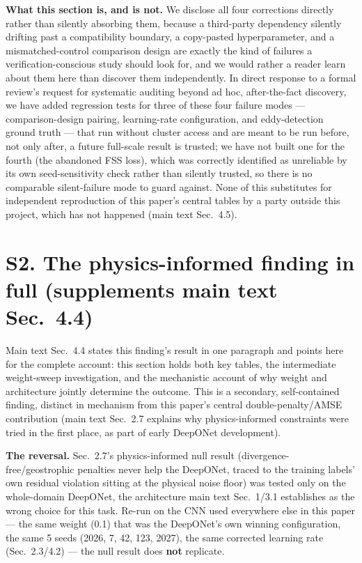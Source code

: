 \documentclass[11pt]{article}
\begin{document}
\textbf{What this section is, and is not.} We disclose all four corrections directly rather than silently absorbing them, because a third-party dependency silently drifting past a compatibility boundary, a copy-pasted hyperparameter, and a mismatched-control comparison design are exactly the kind of failures a verification-conscious study should look for, and we would rather a reader learn about them here than discover them independently. In direct response to a formal review's request for systematic auditing beyond ad hoc, after-the-fact discovery, we have added regression tests for three of these four failure modes --- comparison-design pairing, learning-rate configuration, and eddy-detection ground truth --- that run without cluster access and are meant to be run before, not only after, a future full-scale result is trusted; we have not built one for the fourth (the abandoned FSS loss), which was correctly identified as unreliable by its own seed-sensitivity check rather than silently trusted, so there is no comparable silent-failure mode to guard against. None of this substitutes for independent reproduction of this paper's central tables by a party outside this project, which has not happened (main text Sec.~4.5).

\section*{S2. The physics-informed finding in full (supplements main text Sec.~4.4)}

Main text Sec.~4.4 states this finding's result in one paragraph and points here for the complete account: this section holds both key tables, the intermediate weight-sweep investigation, and the mechanistic account of why weight and architecture jointly determine the outcome. This is a secondary, self-contained finding, distinct in mechanism from this paper's central double-penalty/AMSE contribution (main text Sec.~2.7 explains why physics-informed constraints were tried in the first place, as part of early DeepONet development).

\textbf{The reversal.} Sec.~2.7's physics-informed null result (divergence-free/geostrophic penalties never help the DeepONet, traced to the training labels' own residual violation sitting at the physical noise floor) was tested only on the whole-domain DeepONet, the architecture main text Sec.~1/3.1 establishes as the wrong choice for this task. Re-run on the CNN used everywhere else in this paper --- the same weight (0.1) that was the DeepONet's own winning configuration, the same 5 seeds (2026, 7, 42, 123, 2027), the same corrected learning rate (Sec.~2.3/4.2) --- the null result does \textbf{not} replicate.
\end{document}
